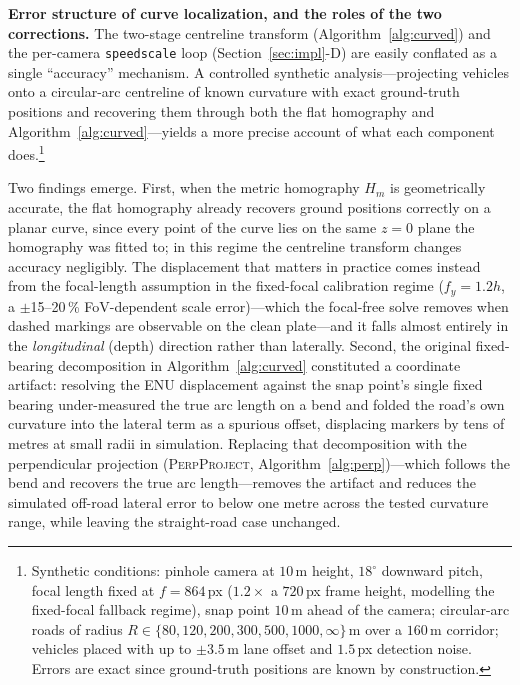 \documentclass[conference]{IEEEtran}
\renewcommand{\_}{\textunderscore\allowbreak}
\begin{document}
\textbf{Error structure of curve localization, and the roles of the two corrections.}
The two-stage centreline transform (Algorithm~\ref{alg:curved}) and the per-camera
\texttt{speed\_scale} loop (Section~\ref{sec:impl}-D) are easily conflated as a
single ``accuracy'' mechanism. A controlled synthetic analysis---projecting vehicles
onto a circular-arc centreline of known curvature with exact ground-truth positions
and recovering them through both the flat homography and Algorithm~\ref{alg:curved}---yields
a more precise account of what each component does.\footnote{Synthetic conditions:
pinhole camera at $10$\,m height, $18^\circ$ downward pitch, focal length fixed at
$f=864$\,px ($1.2\times$ a $720$\,px frame height, modelling the fixed-focal fallback
regime), snap point $10$\,m ahead of the camera;
circular-arc roads of radius $R\in\{80,120,200,300,500,1000,\infty\}$\,m over a
$160$\,m corridor; vehicles placed with up to $\pm3.5$\,m lane offset and $1.5$\,px
detection noise. Errors are exact since ground-truth positions are known by
construction.}

Two findings emerge.
First, when the metric homography $H_m$ is geometrically accurate, the flat
homography already recovers ground positions correctly on a planar curve, since
every point of the curve lies on the same $z{=}0$ plane the homography was fitted
to; in this regime the centreline transform changes accuracy negligibly. The
displacement that matters in practice comes instead from the focal-length assumption
in the fixed-focal calibration regime ($f_y = 1.2h$, a $\pm$15--20\,\% FoV-dependent
scale error)---which the focal-free solve removes when dashed markings are observable on
the clean plate---and it falls almost entirely in the \emph{longitudinal} (depth)
direction rather than laterally.
Second, the original fixed-bearing decomposition in Algorithm~\ref{alg:curved}
constituted a coordinate artifact: resolving the ENU displacement against the snap
point's single fixed bearing under-measured the true arc length on a bend and folded
the road's own curvature into the lateral term as a spurious offset, displacing
markers by tens of metres at small radii in simulation.
Replacing that decomposition with the perpendicular projection
(\textsc{PerpProject}, Algorithm~\ref{alg:perp})---which follows the bend and
recovers the true arc length---removes the artifact and reduces the simulated
off-road lateral error to below one metre across the tested curvature range, while
leaving the straight-road case unchanged.
\end{document}
